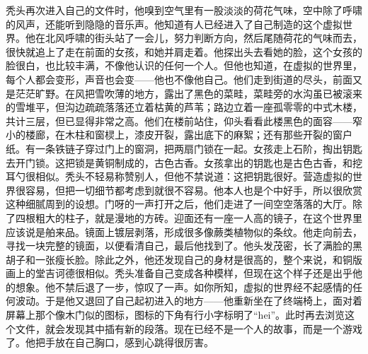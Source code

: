 秃头再次进入自己的文件时，他嗅到空气里有一股淡淡的荷花气味，空中除了呼啸的风声，还能听到隐隐的音乐声。他知道有人已经进入了自己制造的这个虚拟世界。他在北风呼啸的街头站了一会儿，努力判断方向，然后尾随荷花的气味而去，很快就追上了走在前面的女孩，和她并肩走着。他探出头去看她的脸，这个女孩的脸很白，也比较丰满，不像他认识的任何一个人。但他也知道，在虚拟的世界里，每个人都会变形，声音也会变——他也不像他自己。他们走到街道的尽头，前面又是茫茫旷野。在风把雪吹薄的地方，露出了黑色的菜畦，菜畦旁的水沟虽已被滚来的雪堆平，但沟边疏疏落落还立着枯黄的芦苇；路边立着一座孤零零的中式木楼，共计三层，但已显得非常之高。他们在楼前站住，仰头看看此楼黑色的面容——窄小的楼廊，在木柱和窗棂上，漆皮开裂，露出底下的麻絮；还有那些开裂的窗户纸。有一条铁链子穿过门上的窗洞，把两扇门锁在一起。女孩走上石阶，掏出钥匙去开门锁。这把锁是黄铜制成的，古色古香。女孩拿出的钥匙也是古色古香，和挖耳勺很相似。秃头不轻易称赞别人，但他不禁说道：这把钥匙很好。营造虚拟的世界很容易，但把一切细节都考虑到就很不容易。他本人也是个中好手，所以很欣赏这种细腻周到的设想。门呀的一声打开之后，他们走进了一间空空落落的大厅。除了四根粗大的柱子，就是漫地的方砖。迎面还有一座一人高的镜子，在这个世界里应该说是舶来品。镜面上镀层剥落，形成很多像蕨类植物似的条纹。他走向前去，寻找一块完整的镜面，以便看清自己，最后他找到了。他头发茂密，长了满脸的黑胡子和一张瘦长脸。除此之外，他还发现自己的身材是很高的，整个来说，和铜版画上的堂吉诃德很相似。秃头准备自己变成各种模样，但现在这个样子还是出乎他的想象。他不禁后退了一步，惊叹了一声。如你所知，虚拟的世界经不起感情的任何波动。于是他又退回了自己起初进入的地方——他重新坐在了终端椅上，面对着屏幕上那个像木门似的图标，图标的下角有行小字标明了“hei”。此时再去浏览这个文件，就会发现其中插有新的段落。现在已经不是一个人的故事，而是一个游戏了。他把手放在自己胸口，感到心跳得很厉害。 



